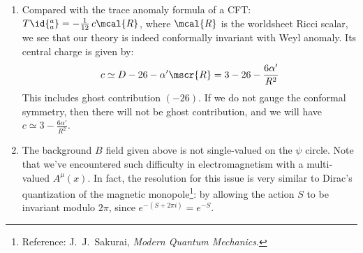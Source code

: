 \documentclass[a4paper,10pt]{article}
\begin{document}
\begin{enumerate}
	\begin{enumerate}
	\item Compared with the trace anomaly formula of a CFT: $
		T\id{^a_a} = -\frac{1}{12}\,c\mcal{R}
	$, where $\mcal{R}$ is the worldsheet Ricci scalar, we see that our theory is indeed conformally invariant with Weyl anomaly. Its central charge is given by:
	\begin{equation}
		c \simeq D-26 - \alpha'\mscr{R}
		= 3 - 26 - \frac{6\alpha'}{R^2}
	\end{equation}
	This includes ghost contribution $(-26)$. If we do not gauge the conformal symmetry, then there will not be ghost contribution, and we will have $
		c \simeq 3 - \frac{6\alpha'}{R^2}
	$. 
	
	\item The background $B$ field given above is not single-valued on the $\psi$ circle. Note that we've encountered such difficulty in electromagnetism with a multi-valued $A^\mu(x)$. In fact, the resolution for this issue is very similar to Dirac's quantization of the magnetic monopole\footnote{
		Reference: J.~J.~Sakurai, \textit{Modern Quantum Mechanics}. 
	}: by allowing the action $S$ to be invariant modulo $2\pi$, since $
		e^{-(S + 2\pi i)} = e^{-S}
	$. 
	

\end{enumerate}
\end{enumerate}
\end{document}
